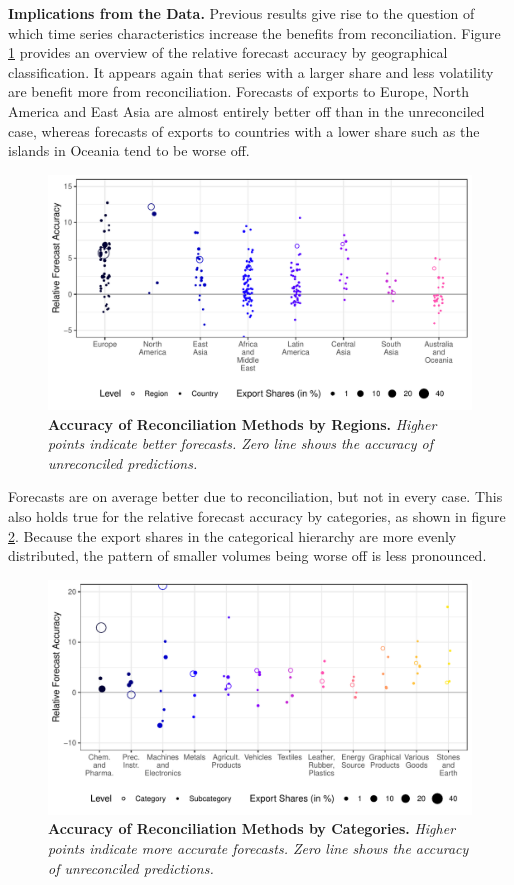 \documentclass[a4paper,fleqn,11pt]{article}
\begin{document}
\noindent\textbf{Implications from the Data.} Previous results give rise to the question of which time series characteristics increase the benefits from reconciliation. Figure \ref{fig:eval_regions} provides an overview of the relative forecast accuracy by geographical classification. It appears again that series with a larger share and less volatility are benefit more from reconciliation. Forecasts of exports to Europe, North America and East Asia are almost entirely better off than in the unreconciled case, whereas forecasts of exports to countries with a lower share such as the islands in Oceania tend to be worse off. 
 \begin{figure}[H]
	\includegraphics[width=\textwidth]{fig/fig_eval_regions}
	\caption[Accuracy of Reconciliation Methods by Regions]{\textbf{Accuracy of Reconciliation Methods by Regions.} \textit{Higher points indicate better forecasts. Zero line shows the accuracy of unreconciled predictions.}}\label{fig:eval_regions}
\end{figure}
Forecasts are on average better due to reconciliation, but not in every case. This also holds true for the relative forecast accuracy by categories, as shown in figure \ref{fig:eval_categories}. Because the export shares in the categorical hierarchy are more evenly distributed, the pattern of smaller volumes being worse off is less pronounced.
 \begin{figure}[H]
	\includegraphics[width=\textwidth]{fig/fig_eval_categories}
	\caption[Accuracy of Reconciliation Methods by Categories]{\textbf{Accuracy of Reconciliation Methods by Categories.} \textit{Higher points indicate more accurate forecasts. Zero line shows the accuracy of unreconciled predictions.}}\label{fig:eval_categories}
\end{figure}
\end{document}
